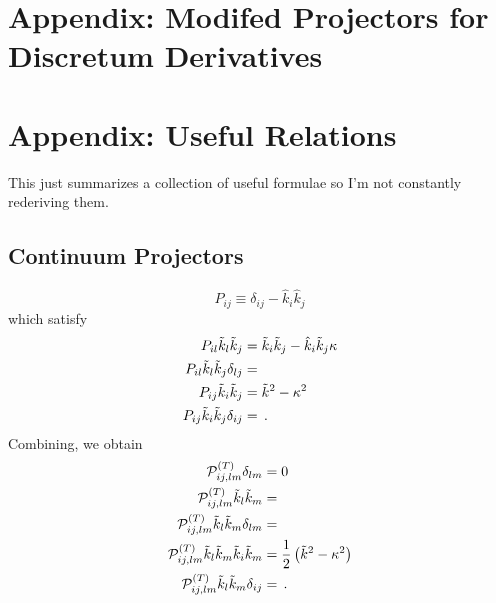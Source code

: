 \documentclass{revtex4}
\begin{document}
\section{Appendix: Modifed Projectors for Discretum Derivatives}

\section{Appendix: Useful Relations}
This just summarizes a collection of useful formulae so I'm not constantly rederiving them.

\subsection{Continuum Projectors}
\begin{equation}
  P_{ij} \equiv \delta_{ij} - \hat{k}_i\hat{k}_j
\end{equation}
which satisfy
\begin{subequations}
\begin{align}
  P_{il}\tilde{k}_l\tilde{k}_j &= \tilde{k}_i\tilde{k}_j - \hat{k}_i\tilde{k}_j\kappa \\
  P_{il}\tilde{k}_l\tilde{k}_j\delta_{lj} &= \\
  P_{ij}\tilde{k}_i\tilde{k}_j &= \tilde{k}^2 - \kappa^2 \\
  P_{ij}\tilde{k}_i\tilde{k}_j\delta_{ij} &= \, .
\end{align}
\end{subequations}
Combining, we obtain
\begin{subequations}
\begin{align}
  \mathcal{P}^{(T)}_{ij,lm}\delta_{lm} &= 0 \\
  \mathcal{P}^{(T)}_{ij,lm}\tilde{k}_l\tilde{k}_m &=  \\
  \mathcal{P}^{(T)}_{ij,lm}\tilde{k}_l\tilde{k}_m\delta_{lm} &= \\
  \mathcal{P}^{(T)}_{ij,lm}\tilde{k}_l\tilde{k}_m\tilde{k}_i\tilde{k}_m &= \frac{1}{2}\left(\tilde{k}^2-\kappa^2\right) \\
  \mathcal{P}^{(T)}_{ij,lm}\tilde{k}_l\tilde{k}_m\delta_{ij} &= \, .
\end{align}
\end{subequations}
\end{document}
